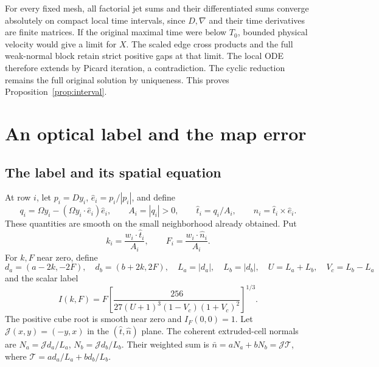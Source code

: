 \documentclass[11pt,a4paper]{article}
\numberwithin{equation}{section}
\theoremstyle{remark}
\begin{document}
For every fixed mesh, all factorial jet sums and their differentiated
sums converge absolutely on compact local time intervals, since
\(D,\nabla\) and their time derivatives are finite matrices.
If the original maximal time were below \(T_0\), bounded physical
velocity would give a limit for \(X\). The scaled edge cross products
and the full weak-normal block retain strict positive gaps at that
limit. The local ODE therefore extends by Picard iteration, a
contradiction. The cyclic reduction remains the full original
solution by uniqueness. This proves Proposition~\ref{prop:interval}.

\section{An optical label and the map error}\label{sec:label}

\subsection{The label and its spatial equation}

At row \(i\), let \(p_i=Dy_i\), \(\hat e_i=p_i/|p_i|\), and define
\[
 q_i=\Omega y_i-(\Omega y_i\cdot\hat e_i)\hat e_i,\qquad
 A_i=|q_i|>0,\qquad \hat t_i=q_i/A_i,\qquad
 \hat n_i=\hat t_i\times\hat e_i.
\] These quantities are smooth
on the small neighborhood already obtained. Put
\[
 k_i=\frac{w_i\cdot\hat t_i}{A_i},\qquad
 F_i=\frac{w_i\cdot\hat n_i}{A_i}.
\]
For \(k,F\) near zero, define
\[
 d_a=(a-2k,-2F),\quad d_b=(b+2k,2F),\quad
 L_a=|d_a|,\quad L_b=|d_b|,\quad
 U=L_a+L_b,\quad V_c=L_b-L_a
\]
and the scalar label
\begin{equation}\label{eq:label}
 I(k,F)=F\left[
  \frac{256}{27(U+1)^3(1-V_c)(1+V_c)^2}
                         \right]^{1/3}.
\end{equation}
The positive cube root is smooth near zero and \(I_F(0,0)=1\).
Let \(\mathcal J(x,y)=(-y,x)\) in the \((\hat t,\hat n)\) plane.
The coherent extruded-cell normals are
\(N_a=\mathcal Jd_a/L_a\), \(N_b=\mathcal Jd_b/L_b\).
Their weighted sum is
\(\bar n=aN_a+bN_b=\mathcal J\mathcal T\), where
\(\mathcal T=ad_a/L_a+bd_b/L_b\).
\end{document}
